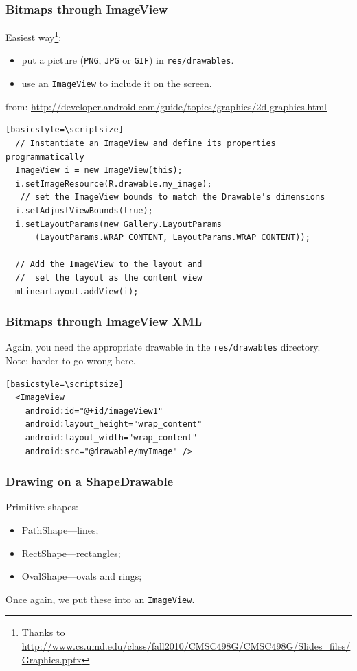 \begin{frame}[fragile]
\frametitle{Bitmaps through ImageView}

\begin{changemargin}{1cm}
Easiest way\footnote{Thanks to \scriptsize \url{http://www.cs.umd.edu/class/fall2010/CMSC498G/CMSC498G/Slides_files/Graphics.pptx}}: 
\begin{itemize}
\item put a picture ({\tt PNG}, {\tt JPG} or {\tt GIF}) in {\tt res/drawables}.
\item use an {\tt ImageView} to include it on the screen.
\end{itemize}
\end{changemargin}

{\tiny from: \url{http://developer.android.com/guide/topics/graphics/2d-graphics.html}}

\begin{verbatim}[basicstyle=\scriptsize]
  // Instantiate an ImageView and define its properties programmatically
  ImageView i = new ImageView(this);
  i.setImageResource(R.drawable.my_image);
   // set the ImageView bounds to match the Drawable's dimensions
  i.setAdjustViewBounds(true);
  i.setLayoutParams(new Gallery.LayoutParams
      (LayoutParams.WRAP_CONTENT, LayoutParams.WRAP_CONTENT));

  // Add the ImageView to the layout and 
  //  set the layout as the content view
  mLinearLayout.addView(i);
\end{verbatim}
\end{frame}


\begin{frame}[fragile]
\frametitle{Bitmaps through ImageView XML}

\begin{changemargin}{1cm}
Again, you need the appropriate drawable in the {\tt res/drawables} directory.\\[1em]
Note: harder to go wrong here.

\begin{verbatim}[basicstyle=\scriptsize]
  <ImageView
    android:id="@+id/imageView1"
    android:layout_height="wrap_content"
    android:layout_width="wrap_content"
    android:src="@drawable/myImage" />
\end{verbatim}
\end{changemargin}

\end{frame}

\begin{frame}[fragile]
\frametitle{Drawing on a ShapeDrawable}
\begin{changemargin}{1cm}
Primitive shapes: 
\begin{itemize}
\item PathShape---lines;
\item RectShape---rectangles;
\item OvalShape---ovals and rings;
\end{itemize}
Once again, we put these into an {\tt ImageView}.
\end{changemargin}
\end{frame}

